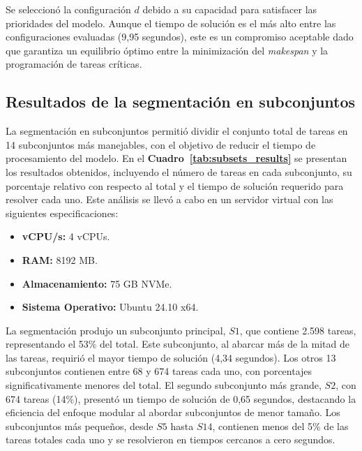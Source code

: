 \documentclass{article}
\begin{document}
Se seleccionó la configuración \( d \) debido a su capacidad para satisfacer las prioridades del modelo. Aunque el tiempo de solución es el más alto entre las configuraciones evaluadas (9,95 segundos), este es un compromiso aceptable dado que garantiza un equilibrio óptimo entre la minimización del \textit{makespan} y la programación de tareas críticas.

\subsection{Resultados de la segmentación en subconjuntos}

La segmentación en subconjuntos permitió dividir el conjunto total de tareas en 14 subconjuntos más manejables, con el objetivo de reducir el tiempo de procesamiento del modelo. En el \textbf{Cuadro~\ref{tab:subsets_results}} se presentan los resultados obtenidos, incluyendo el número de tareas en cada subconjunto, su porcentaje relativo con respecto al total y el tiempo de solución requerido para resolver cada uno. Este análisis se llevó a cabo en un servidor virtual con las siguientes especificaciones:  

\begin{itemize}
    \item \textbf{vCPU/s:} 4 vCPUs.
    \item \textbf{RAM:} 8192 MB.
    \item \textbf{Almacenamiento:} 75 GB NVMe.
    \item \textbf{Sistema Operativo:} Ubuntu 24.10 x64.
\end{itemize}


La segmentación produjo un subconjunto principal, \( S1 \), que contiene 2.598 tareas, representando el 53\% del total. Este subconjunto, al abarcar más de la mitad de las tareas, requirió el mayor tiempo de solución (4,34 segundos). Los otros 13 subconjuntos contienen entre 68 y 674 tareas cada uno, con porcentajes significativamente menores del total. El segundo subconjunto más grande, \( S2 \), con 674 tareas (14\%), presentó un tiempo de solución de 0,65 segundos, destacando la eficiencia del enfoque modular al abordar subconjuntos de menor tamaño. Los subconjuntos más pequeños, desde \( S5 \) hasta \( S14 \), contienen menos del 5\% de las tareas totales cada uno y se resolvieron en tiempos cercanos a cero segundos.
\end{document}
